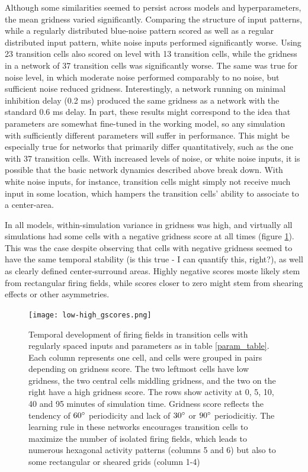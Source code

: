 \documentclass{article}
\begin{document}
    Although some similarities seemed to persist across models and hyperparameters, the mean gridness varied significantly. Comparing the structure of input patterns, while a regularly distributed blue-noise pattern scored as well as a regular distributed input pattern, white noise inputs performed significantly worse.  Using 23 transition cells also scored on level with 13 transition cells, while the gridness in a network of 37 transition cells was significantly worse. The same was true for noise level, in which moderate noise performed comparably to no noise, but sufficient noise reduced gridness. Interestingly, a network running on minimal inhibition delay (0.2 ms) produced the same gridness as a network with the standard 0.6 ms delay.
    In part, these results might correspond to the idea that parameters are somewhat fine-tuned in the working model, so any simulation with sufficiently different parameters will suffer in performance. This might be especially true for networks that primarily differ quantitatively, such as the one with 37 transition cells. With increased levels of noise, or white noise inputs, it is possible that the basic network dynamics described above break down. With white noise inputs, for instance, transition cells might simply not receive much input in some location, which hampers the transition cells' ability to associate to a center-area. 

    In all models, within-simulation variance in gridness was high, and virtually all simulations had some cells with a negative gridness score at all times (figure \ref{low-high_gscores}). This was the case despite observing that cells with negative gridness seemed to have the same temporal stability (is this true - I can quantify this, right?), as well as clearly defined center-surround areas. Highly negative scores moste likely stem from rectangular firing fields, while scores closer to zero might stem from shearing effects or other asymmetries. 

    \begin{figure}[H]
        \centering
        \begin{minipage}[b]{\linewidth}
        \texttt{[image: low-high\_gscores.png]}
        \caption{Temporal development of firing fields in transition cells with regularly spaced inputs and parameters as in table \ref{param_table}. Each column represents one cell, and cells were grouped in pairs depending on gridness score. The two leftmost cells have low gridness, the two central cells middling gridness, and the two on the right have a high gridness score. The rows show activity at 0, 5, 10, 40 and 95 minutes of simulation time. Gridness score reflects the tendency of \(60\degree\) periodicity and lack of \(30\degree\) or \(90\degree\) periodicitiy. The learning rule in these networks encourages transition cells to maximize the number of isolated firing fields, which leads to numerous hexagonal activity patterns (columns 5 and 6) but also to some rectangular or sheared grids (column 1-4)} 
        \label{low-high_gscores}
        \end{minipage}
    \end{figure}
\end{document}
